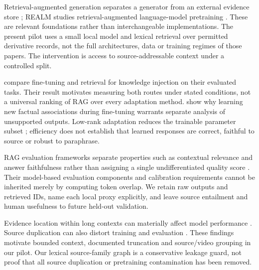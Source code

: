 Retrieval-augmented generation separates a generator from an external evidence store \citep{lewis2020rag}; REALM studies retrieval-augmented language-model pretraining \citep{guu2020realm}. These are relevant foundations rather than interchangeable implementations. The present pilot uses a small local model and lexical retrieval over permitted derivative records, not the full architectures, data or training regimes of those papers. The intervention is access to source-addressable context under a controlled split.

\citet{ovadia2024finetuning} compare fine-tuning and retrieval for knowledge injection on their evaluated tasks. Their result motivates measuring both routes under stated conditions, not a universal ranking of RAG over every adaptation method. \citet{gekhman2024hallucinations} show why learning new factual associations during fine-tuning warrants separate analysis of unsupported outputs. Low-rank adaptation reduces the trainable parameter subset \citep{hu2022lora}; efficiency does not establish that learned responses are correct, faithful to source or robust to paraphrase.

RAG evaluation frameworks separate properties such as contextual relevance and answer faithfulness rather than assigning a single undifferentiated quality score \citep{es2024ragas,saadfalcon2024ares}. Their model-based evaluation components and calibration requirements cannot be inherited merely by computing token overlap. We retain raw outputs and retrieved IDs, name each local proxy explicitly, and leave source entailment and human usefulness to future held-out validation.

Evidence location within long contexts can materially affect model performance \citep{liu2024lostmiddle}. Source duplication can also distort training and evaluation \citep{lee2022dedup}. These findings motivate bounded context, documented truncation and source/video grouping in our pilot. Our lexical source-family graph is a conservative leakage guard, not proof that all source duplication or pretraining contamination has been removed.
